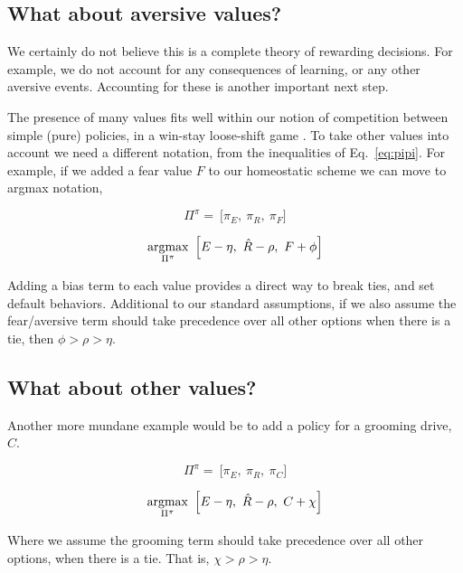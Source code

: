 \subsection*{What about aversive values?}
We certainly do not believe this is a complete theory of rewarding decisions. For example, we do not account for any consequences of learning, or any other aversive events. Accounting for these is another important next step.

The presence of many values fits well within our notion of competition between simple (pure) policies, in a win-stay loose-shift game \cite{Estes1994TowardAS}. To take other values into account we need a different notation, from the inequalities of Eq.~\ref{eq:pipi}. For example, if we added a fear value $F$ to our homeostatic scheme we can move to argmax notation,

\begin{equation}
\label{eq:pipi_f} 
\Pi^{\pi} = \ \Big [ \pi_E,\ \pi_R,\ \pi_F \Big ]
\end{equation}

\begin{equation}
\label{eq:meta_greedy_f} 
	\operatorname*{argmax}_{\Pi^{\pi}} \ \Big [ E - \eta,\ \hat R - \rho,\ F + \phi \Big ]
\end{equation}

Adding a bias term to each value provides a direct way to break ties, and set default behaviors. Additional to our standard assumptions, if we also assume the fear/aversive term should take precedence over all other options when there is a tie, then $\phi > \rho > \eta$.

\subsection*{What about other values?}
Another more mundane example would be to add a policy for a grooming drive, $C$. 

\begin{equation}
\label{eq:pipi_c} 
\Pi^{\pi} = \ \Big [ \pi_E,\ \pi_R,\ \pi_C \Big ]
\end{equation}

\begin{equation}
\label{eq:meta_greedy_c} 
\operatorname*{argmax}_{\Pi^{\pi}} \ \Big [ E - \eta,\ \hat R - \rho,\ C + \chi \Big ]
\end{equation}

Where we assume the grooming term should take precedence over all other options, when there is a tie. That is, $\chi > \rho > \eta$.

